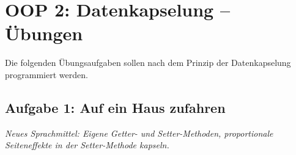 \clearpage

\rehead[]{\textcolor{lightblue}{AvHG, Inf, My}}
\lohead[]{\textcolor{lightblue}{AvHG, Inf, My}}

\section{OOP 2: Datenkapselung -- Übungen \tagZusatz}

Die folgenden Übungsaufgaben sollen nach dem Prinzip der Datenkapselung programmiert werden.


\subsection{Aufgabe 1: Auf ein Haus zufahren}
\noindent \emph{Neues Sprachmittel: Eigene Getter- und Setter-Methoden, proportionale Seiteneffekte in der Setter-Methode kapseln.}

